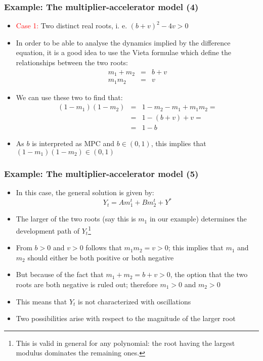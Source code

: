\documentclass[10pt,usenames,dvipsnames]{beamer}
\theoremstyle{plain}
\theoremstyle{definition}
\begin{document}
\begin{frame}[fragile]
\frametitle{Example: The multiplier-accelerator model (4)}
\begin{itemize}
	\item \textcolor{red}{Case 1:} Two distinct real roots, i. e. $(b+v)^{2} - 4v > 0$ 
	\item In order to be able to analyse the dynamics implied by the difference equation, it is a good idea to use the Vieta formulae which define the relationships between the two roots:
	\[
		\begin{array}{lcl}
			m_{1} + m_{2} & = & b + v\\
			m_{1}m_{2} & = & v
		\end{array}
	\]
	\item We can use these two to find that:
	\[
	\begin{array}{lcl}
		(1 - m_{1})(1 - m_{2}) & = & 1 - m_{2} - m_{1} + m_{1}m_{2} = \\
		& = & 1 - (b + v) + v = \\
		& = & 1 - b
	\end{array}
	\]
	\item As $b$ is interpreted as MPC and $b \in (0,1)$, this implies that $(1 - m_{1})(1 - m_{2}) \in (0,1)$
\end{itemize}
\end{frame}

\begin{frame}[fragile]
\frametitle{Example: The multiplier-accelerator model (5)}
\begin{itemize}
	\item In this case, the general solution is given by:
	\[
		Y_{t} = Am_{1}^{t} + Bm_{2}^{t} + Y^{*}
	\]
	\item The larger of the two roots (say this is $m_{1}$ in our example) determines the development path of $Y_{t}$\footnote{This is valid in general for any polynomial: the root having the largest modulus dominates the remaining ones.}
	\item From $b > 0$ and $v > 0$ follows that $m_{1}m_{2} = v > 0$; this implies that $m_{1}$ and $m_{2}$ should either be both positive or both negative
	\item But because of the fact that $m_{1} + m_{2} = b + v > 0$, the option that the two roots are both negative is ruled out; therefore $m_{1} > 0$ and $m_{2} > 0$
	\item This means that $Y_{t}$ is not characterized with oscillations
	\item Two possibilities arise with respect to the magnitude of the larger root 
\end{itemize}
\end{frame}
\end{document}

